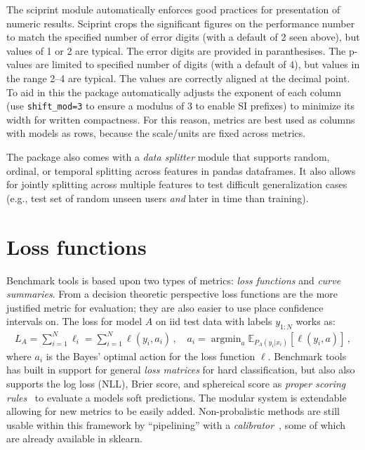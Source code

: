 \documentclass{article}
\newcommand{\E}{\mathbb{E}}
\DeclareMathOperator*{\argmin}{argmin}
\newcommand{\code}{\texttt}
\begin{document}
The sciprint module automatically enforces good practices for presentation of numeric results.
Sciprint crops the significant figures on the performance number to match the specified number of error digits (with a default of 2 seen above), but values of 1 or 2 are typical.
The error digits are provided in paranthesises.
The p-values are limited to specified number of digits (with a default of 4), but values in the range 2--4 are typical.
The values are correctly aligned at the decimal point.
To aid in this the package automatically adjusts the exponent of each column (use \code{shift\_mod=3} to ensure a modulus of 3 to enable SI prefixes) to minimize its width for written compactness.
For this reason, metrics are best used as columns with models as rows, because the scale/units are fixed across metrics.

The package also comes with a \emph{data splitter} module that supports random, ordinal, or temporal splitting across features in pandas dataframes.
It also allows for jointly splitting across multiple features to test difficult generalization cases (e.g., test set of random unseen users \emph{and} later in time than training)\@.

\section{Loss functions}

Benchmark tools is based upon two types of metrics: \emph{loss functions} and \emph{curve summaries}.
From a decision theoretic perspective loss functions are the more justified metric for evaluation; they are also easier to use place confidence intervals on.
The loss for model $A$ on iid test data with labels $y_{1:N}$ works as:
\begin{align}
  L_A = \sum_{i=1}^N \ell_i = \sum_{i=1}^N \ell(y_i, a_i)\,, \quad a_i = \argmin_a \E_{P_A(y_i|x_i)}[\ell(y_i, a)]\,,
\end{align}
where $a_i$ is the Bayes' optimal action for the loss function $\ell$.
Benchmark tools has built in support for general \emph{loss matrices} for hard classification, but also also supports the log loss (NLL), Brier score, and sphereical score as \emph{proper scoring rules}~\citep{Gneiting2007} to evaluate a models soft predictions.
The modular system is extendable allowing for new metrics to be easily added.
Non-probalistic methods are still usable within this framework by ``pipelining'' with a \emph{calibrator}~\citep{Platt1999,Kull2017}, some of which are already available in sklearn.
\end{document}
